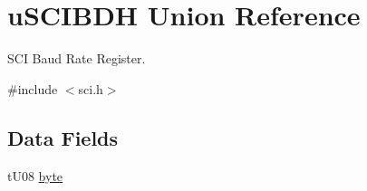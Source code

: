 \hypertarget{unionu_s_c_i_b_d_h}{}\section{u\+S\+C\+I\+B\+D\+H Union Reference}
\label{unionu_s_c_i_b_d_h}


S\+C\+I Baud Rate Register.  




{\ttfamily \#include $<$sci.\+h$>$}

\subsection*{Data Fields}
\begin{DoxyCompactItemize}
\item 
\hypertarget{unionu_s_c_i_b_d_h_aba308d63db050aed25cfd36c37e41ad4}{}t\+U08 \hyperlink{unionu_s_c_i_b_d_h_aba308d63db050aed25cfd36c37e41ad4}{byte}\label{unionu_s_c_i_b_d_h_aba308d63db050aed25cfd36c37e41ad4}


\end{DoxyCompactItemize}
